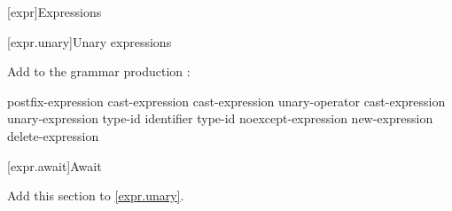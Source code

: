 

\setcounter{chapter}{4}
[expr]{Expressions}

\setcounter{section}{2}
[expr.unary]{Unary expressions}


Add  to the grammar production :

\begin{bnf}
	\br
	postfix-expression\br
	\terminal{++} cast-expression\br
	\terminal{-{-}} cast-expression\br
	\br
	unary-operator cast-expression\br
	 unary-expression\br
	 type-id \terminal{)}\br
	 \terminal{(} identifier \terminal{)}\br
	 type-id \terminal{)}\br
	noexcept-expression\br
	new-expression\br
	delete-expression\br
\end{bnf}

%
%
%

\setcounter{subsection}{7}
[expr.await]{Await}

Add this section to \ref{expr.unary}.

